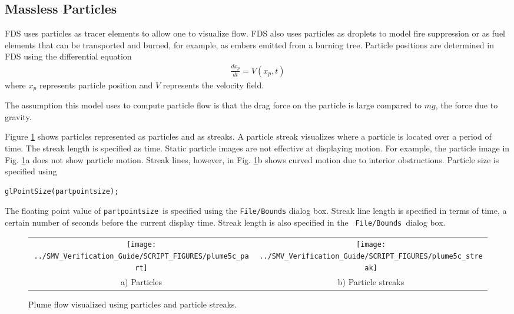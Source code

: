 \documentclass[11pt,twoside]{book}
\begin{document}
\subsection{Massless Particles}
FDS uses particles as tracer elements to allow one to visualize
flow.  FDS also uses particles as droplets to model fire
suppression or as fuel elements that can be transported and
burned, for example, as embers emitted from a burning tree.
Particle positions are determined in FDS using the differential
equation
\begin{eqnarray}
\frac{dx_p}{dt}=V(x_p,t)
\end{eqnarray}
where $x_p$ represents particle position and $V$ represents the
velocity field.

The assumption this model uses to compute particle flow is that
the drag force on the particle is large compared to $mg$, the
force due to gravity.

Figure \ref{figpart} shows particles represented as particles and
as streaks. A particle streak visualizes where a particle is
located over a period of time.  The streak length is specified as
time. Static particle images are not effective at displaying
motion.  For example, the particle image in Fig. \ref{figpart}a
does not show particle motion.  Streak lines, however, in Fig.
\ref{figpart}b shows curved motion due to interior obstructions.
Particle size is specified using
\begin{lstlisting}
glPointSize(partpointsize);
\end{lstlisting}
The floating point value of {\tt partpointsize}\ is specified
using the {\tt File/Bounds} dialog box.  Streak line length is
specified in terms of time, a certain number of seconds before the
current display time.  Streak length is also specified in the {\tt
File/Bounds}\ dialog box.

\begin{figure}[\figoptions]
\begin{center}
\begin{tabular}{cc}
\texttt{[image: ../SMV\_Verification\_Guide/SCRIPT\_FIGURES/plume5c\_part]}&
\texttt{[image: ../SMV\_Verification\_Guide/SCRIPT\_FIGURES/plume5c\_streak]}\\
a) Particles&b) Particle streaks\\
\end{tabular}
\end{center}
\caption{Plume flow visualized using particles and particle streaks.}
\label{figpart}%
\end{figure}
\end{document}
